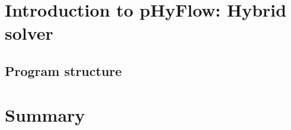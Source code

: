 

%
%	
%
%


\section{Introduction to pHyFlow: Hybrid solver}
\subsection{Program structure}

\section{Summary}



